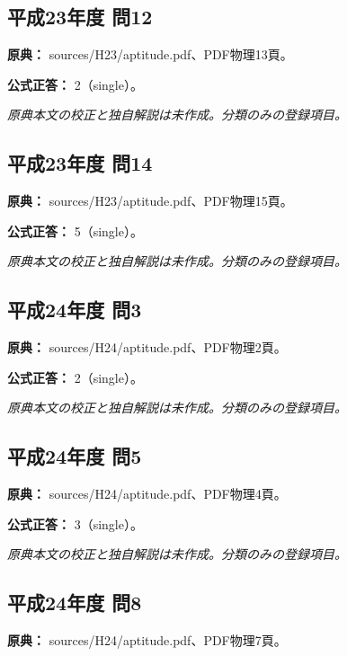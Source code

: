 \subsection{平成23年度 問12}
\label{q:h23-reg-apt-12}

\noindent\textbf{原典：} sources/H23/aptitude.pdf、PDF物理13頁。

\textbf{公式正答：} 2（single）。

\par\textit{原典本文の校正と独自解説は未作成。分類のみの登録項目。}

\subsection{平成23年度 問14}
\label{q:h23-reg-apt-14}

\noindent\textbf{原典：} sources/H23/aptitude.pdf、PDF物理15頁。

\textbf{公式正答：} 5（single）。

\par\textit{原典本文の校正と独自解説は未作成。分類のみの登録項目。}

\subsection{平成24年度 問3}
\label{q:h24-reg-apt-03}

\noindent\textbf{原典：} sources/H24/aptitude.pdf、PDF物理2頁。

\textbf{公式正答：} 2（single）。

\par\textit{原典本文の校正と独自解説は未作成。分類のみの登録項目。}

\subsection{平成24年度 問5}
\label{q:h24-reg-apt-05}

\noindent\textbf{原典：} sources/H24/aptitude.pdf、PDF物理4頁。

\textbf{公式正答：} 3（single）。

\par\textit{原典本文の校正と独自解説は未作成。分類のみの登録項目。}

\subsection{平成24年度 問8}
\label{q:h24-reg-apt-08}

\noindent\textbf{原典：} sources/H24/aptitude.pdf、PDF物理7頁。

